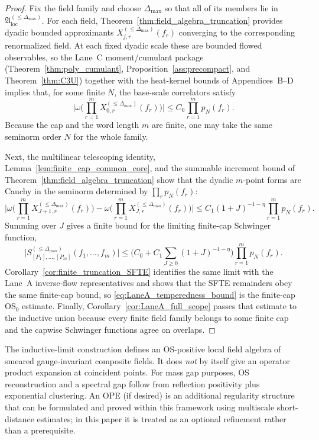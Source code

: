\begin{proof}
Fix the field family and choose $\Delta_{\max}$ so that all of its members lie in $\mathfrak A_{\mathrm{loc}}^{(\le \Delta_{\max})}$.
For each field, Theorem~\ref{thm:field_algebra_truncation} provides dyadic bounded approximants
$X^{(\le \Delta_{\max})}_{j,r}(f_r)$ converging to the corresponding renormalized field.
At each fixed dyadic scale these are bounded flowed observables, so the Lane~C moment/cumulant package
(Theorem~\ref{thm:poly_cumulant}, Proposition~\ref{ass:precompact}, and Theorem~\ref{thm:C3U}) together with the heat-kernel bounds of Appendices~B--D implies that, for some finite $N$, the base-scale correlators satisfy
\[
\Big|\omega\Big(\prod_{r=1}^m X^{(\le \Delta_{\max})}_{0,r}(f_r)\Big)\Big|
\le C_0\prod_{r=1}^m p_N(f_r).
\]
Because the cap and the word length $m$ are finite, one may take the same seminorm order $N$ for the whole family.

Next, the multilinear telescoping identity, Lemma~\ref{lem:finite_cap_common_core}, and the summable increment bound of Theorem~\ref{thm:field_algebra_truncation} show that the dyadic $m$-point forms are Cauchy in the seminorm determined by $\prod_r p_N(f_r)$:
\[
\Big|
\omega\Big(\prod_{r=1}^m X^{(\le \Delta_{\max})}_{J+1,r}(f_r)\Big)
-
\omega\Big(\prod_{r=1}^m X^{(\le \Delta_{\max})}_{J,r}(f_r)\Big)
\Big|
\le C_1(1+J)^{-1-\eta}\prod_{r=1}^m p_N(f_r).
\]
Summing over $J$ gives a finite bound for the limiting finite-cap Schwinger function,
\[
\Big|S^{(\le \Delta_{\max})}_{[P_1],\dots,[P_m]}(f_1,\dots,f_m)\Big|
\le \Big(C_0+C_1\sum_{J\ge 0}(1+J)^{-1-\eta}\Big)\prod_{r=1}^m p_N(f_r).
\]
Corollary~\ref{cor:finite_truncation_SFTE} identifies the same limit with the Lane~A inverse-flow representatives and shows that the SFTE remainders obey the same finite-cap bound, so \eqref{eq:LaneA_temperedness_bound} is the finite-cap OS$_0$ estimate.
Finally, Corollary~\ref{cor:LaneA_full_scope} passes that estimate to the inductive union because every finite field family belongs to some finite cap and the capwise Schwinger functions agree on overlaps.
\end{proof}

\begin{remark}
The inductive-limit construction defines an OS-positive local field algebra of smeared gauge-invariant composite fields.
It does \emph{not} by itself give an operator product expansion at coincident points.
For mass gap purposes, OS reconstruction and a spectral gap follow from reflection positivity plus exponential clustering.
An OPE (if desired) is an additional regularity structure that can be formulated and proved within this framework using multiscale
short-distance estimates; in this paper it is treated as an optional refinement rather than a prerequisite.
\end{remark}


